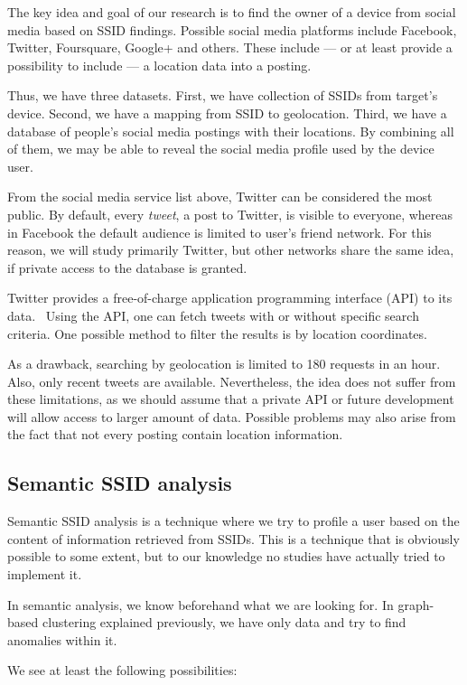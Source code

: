 \documentclass[12pt,a4paper,oneside,pdftex]{report}
\begin{document}
The key idea and goal of our research is to find the owner of a device from social media based on SSID findings. Possible social media platforms include Facebook, Twitter, Foursquare, Google+ and others. These include --- or at least provide a possibility to include --- a location data into a posting. 

Thus, we have three datasets. First, we have collection of SSIDs from target's device. Second, we have a mapping from SSID to geolocation. Third, we have a database of people's social media postings with their locations. By combining all of them, we may be able to reveal the social media profile used by the device user.

From the social media service list above, Twitter can be considered the most public. By default, every \emph{tweet}, a post to Twitter, is visible to everyone, whereas in Facebook the default audience is limited to user's friend network. For this reason, we will study primarily Twitter, but other networks share the same idea, if private access to the database is granted.

Twitter provides a free-of-charge application programming interface (API) to its data.~\cite{twitterapi} Using the API, one can fetch tweets with or without specific search criteria. One possible method to filter the results is by location coordinates.

As a drawback, searching by geolocation is limited to 180 requests in an hour. Also, only recent tweets are available. Nevertheless, the idea does not suffer from these limitations, as we should assume that a private API or future development will allow access to larger amount of data. Possible problems may also arise from the fact that not every posting contain location information.


\subsection{Semantic SSID analysis}

Semantic SSID analysis is a technique where we try to profile a user based on the content of information retrieved from SSIDs. This is a technique that is obviously possible to some extent, but to our knowledge no studies have actually tried to implement it.

In semantic analysis, we know beforehand what we are looking for. In graph-based clustering explained previously, we have only data and try to find anomalies within it.

We see at least the following possibilities:\\
\end{document}
